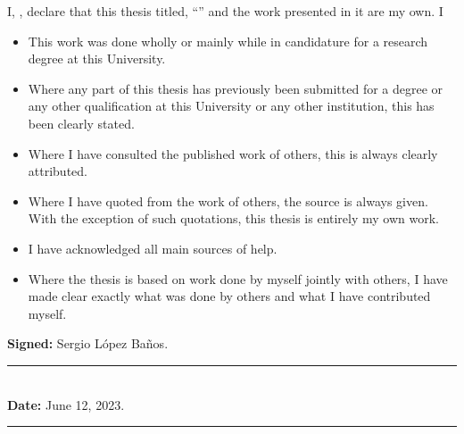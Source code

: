 \documentclass[
11pt, %
english, %
singlespacing, %
headsepline, %
]{MastersDoctoralThesis} %
\begin{document}
\begin{declaration}
\addchaptertocentry{\authorshipname} %
\noindent I, \authorname, declare that this thesis titled, \enquote{\ttitle} and the work presented in it are my own. I %

\begin{itemize} 
\item This work was done wholly or mainly while in candidature for a research degree at this University.
\item Where any part of this thesis has previously been submitted for a degree or any other qualification at this University or any other institution, this has been clearly stated.
\item Where I have consulted the published work of others, this is always clearly attributed.
\item Where I have quoted from the work of others, the source is always given. With the exception of such quotations, this thesis is entirely my own work.
\item I have acknowledged all main sources of help.
\item Where the thesis is based on work done by myself jointly with others, I have made clear exactly what was done by others and what I have contributed myself.
\end{itemize}
\vspace{5mm}
 \begin{center}
   \noindent \textbf{Signed:} \color{blue}Sergio López Baños\color{black}.\\
\rule[0.5em]{25em}{0.5pt}\\ %
\noindent \textbf{Date:} \color{blue} June 12, 2023\color{black}.\\
\rule[0.5em]{25em}{0.5pt} %
 \end{center}
\end{declaration}

\cleardoublepage



\end{document}
